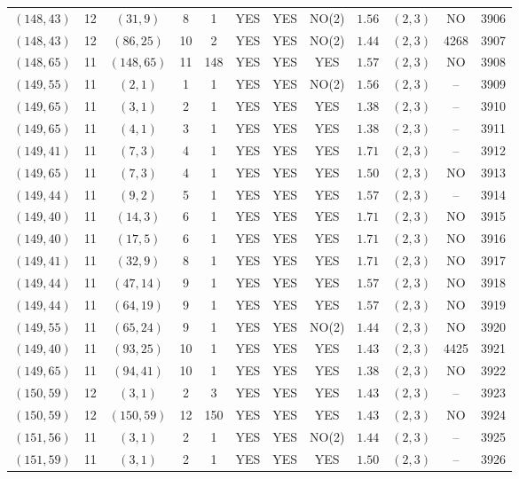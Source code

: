 \begin{longtable}{|c|c|c|c|c|c|c|c|c|c|c|c|}
$(148,43)$ & 12 & $(31,9)$ & 8 & 1 & YES & YES & NO(2) & $1.56$ & $(2,3)$ & NO & 3906\\
$(148,43)$ & 12 & $(86,25)$ & 10 & 2 & YES & YES & NO(2) & $1.44$ & $(2,3)$ & 4268 & 3907\\
$(148,65)$ & 11 & $(148,65)$ & 11 & 148 & YES & YES & YES & $1.57$ & $(2,3)$ & NO & 3908\\
$(149,55)$ & 11 & $(2,1)$ & 1 & 1 & YES & YES & NO(2) & $1.56$ & $(2,3)$ & -- & 3909\\
$(149,65)$ & 11 & $(3,1)$ & 2 & 1 & YES & YES & YES & $1.38$ & $(2,3)$ & -- & 3910\\
$(149,65)$ & 11 & $(4,1)$ & 3 & 1 & YES & YES & YES & $1.38$ & $(2,3)$ & -- & 3911\\
$(149,41)$ & 11 & $(7,3)$ & 4 & 1 & YES & YES & YES & $1.71$ & $(2,3)$ & -- & 3912\\
$(149,65)$ & 11 & $(7,3)$ & 4 & 1 & YES & YES & YES & $1.50$ & $(2,3)$ & NO & 3913\\
$(149,44)$ & 11 & $(9,2)$ & 5 & 1 & YES & YES & YES & $1.57$ & $(2,3)$ & -- & 3914\\
$(149,40)$ & 11 & $(14,3)$ & 6 & 1 & YES & YES & YES & $1.71$ & $(2,3)$ & NO & 3915\\
$(149,40)$ & 11 & $(17,5)$ & 6 & 1 & YES & YES & YES & $1.71$ & $(2,3)$ & NO & 3916\\
$(149,41)$ & 11 & $(32,9)$ & 8 & 1 & YES & YES & YES & $1.71$ & $(2,3)$ & NO & 3917\\
$(149,44)$ & 11 & $(47,14)$ & 9 & 1 & YES & YES & YES & $1.57$ & $(2,3)$ & NO & 3918\\
$(149,44)$ & 11 & $(64,19)$ & 9 & 1 & YES & YES & YES & $1.57$ & $(2,3)$ & NO & 3919\\
$(149,55)$ & 11 & $(65,24)$ & 9 & 1 & YES & YES & NO(2) & $1.44$ & $(2,3)$ & NO & 3920\\
$(149,40)$ & 11 & $(93,25)$ & 10 & 1 & YES & YES & YES & $1.43$ & $(2,3)$ & 4425 & 3921\\
$(149,65)$ & 11 & $(94,41)$ & 10 & 1 & YES & YES & YES & $1.38$ & $(2,3)$ & NO & 3922\\
$(150,59)$ & 12 & $(3,1)$ & 2 & 3 & YES & YES & YES & $1.43$ & $(2,3)$ & -- & 3923\\
$(150,59)$ & 12 & $(150,59)$ & 12 & 150 & YES & YES & YES & $1.43$ & $(2,3)$ & NO & 3924\\
$(151,56)$ & 11 & $(3,1)$ & 2 & 1 & YES & YES & NO(2) & $1.44$ & $(2,3)$ & -- & 3925\\
$(151,59)$ & 11 & $(3,1)$ & 2 & 1 & YES & YES & YES & $1.50$ & $(2,3)$ & -- & 3926\\

\end{longtable}
